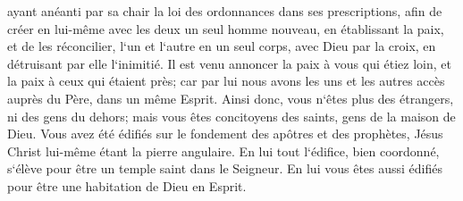 \verse ayant anéanti par sa chair la loi des ordonnances dans ses prescriptions, afin de créer en lui-même avec les deux un seul homme nouveau, en établissant la paix, 
\verse et de les réconcilier, l`un et l`autre en un seul corps, avec Dieu par la croix, en détruisant par elle l`inimitié. 
\verse Il est venu annoncer la paix à vous qui étiez loin, et la paix à ceux qui étaient près; 
\verse car par lui nous avons les uns et les autres accès auprès du Père, dans un même Esprit. 
\verse Ainsi donc, vous n`êtes plus des étrangers, ni des gens du dehors; mais vous êtes concitoyens des saints, gens de la maison de Dieu. 
\verse Vous avez été édifiés sur le fondement des apôtres et des prophètes, Jésus Christ lui-même étant la pierre angulaire. 
\verse En lui tout l`édifice, bien coordonné, s`élève pour être un temple saint dans le Seigneur. 
\verse En lui vous êtes aussi édifiés pour être une habitation de Dieu en Esprit. 

